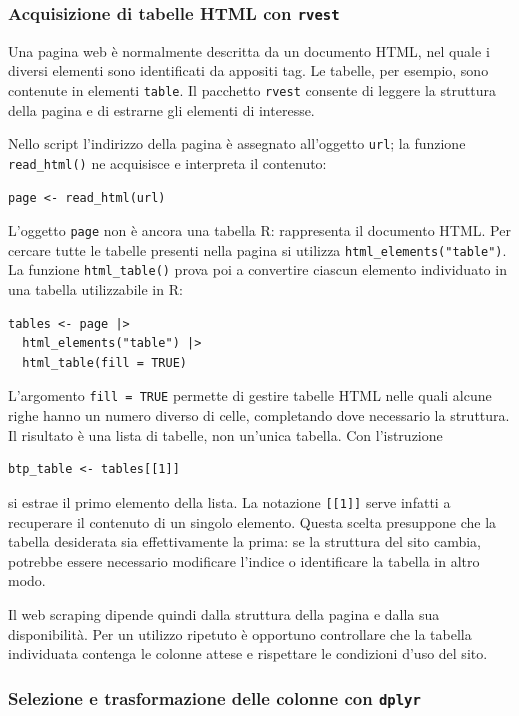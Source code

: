 \subsubsection{Acquisizione di tabelle HTML con \texttt{rvest}}

Una pagina web è normalmente descritta da un documento HTML, nel quale i diversi elementi sono identificati da appositi tag. Le tabelle, per esempio, sono contenute in elementi \texttt{table}. Il pacchetto \texttt{rvest} consente di leggere la struttura della pagina e di estrarne gli elementi di interesse.

Nello script l'indirizzo della pagina è assegnato all'oggetto \texttt{url}; la funzione \texttt{read\_html()} ne acquisisce e interpreta il contenuto:
\begin{verbatim}
page <- read_html(url)
\end{verbatim}
L'oggetto \texttt{page} non è ancora una tabella R: rappresenta il documento HTML. Per cercare tutte le tabelle presenti nella pagina si utilizza \texttt{html\_elements("table")}. La funzione \texttt{html\_table()} prova poi a convertire ciascun elemento individuato in una tabella utilizzabile in R:
\begin{verbatim}
tables <- page |>
  html_elements("table") |>
  html_table(fill = TRUE)
\end{verbatim}
L'argomento \texttt{fill = TRUE} permette di gestire tabelle HTML nelle quali alcune righe hanno un numero diverso di celle, completando dove necessario la struttura. Il risultato è una lista di tabelle, non un'unica tabella. Con l'istruzione
\begin{verbatim}
btp_table <- tables[[1]]
\end{verbatim}
si estrae il primo elemento della lista. La notazione \texttt{[[1]]} serve infatti a recuperare il contenuto di un singolo elemento. Questa scelta presuppone che la tabella desiderata sia effettivamente la prima: se la struttura del sito cambia, potrebbe essere necessario modificare l'indice o identificare la tabella in altro modo.

Il web scraping dipende quindi dalla struttura della pagina e dalla sua disponibilità. Per un utilizzo ripetuto è opportuno controllare che la tabella individuata contenga le colonne attese e rispettare le condizioni d'uso del sito.

\subsubsection{Selezione e trasformazione delle colonne con \texttt{dplyr}}

